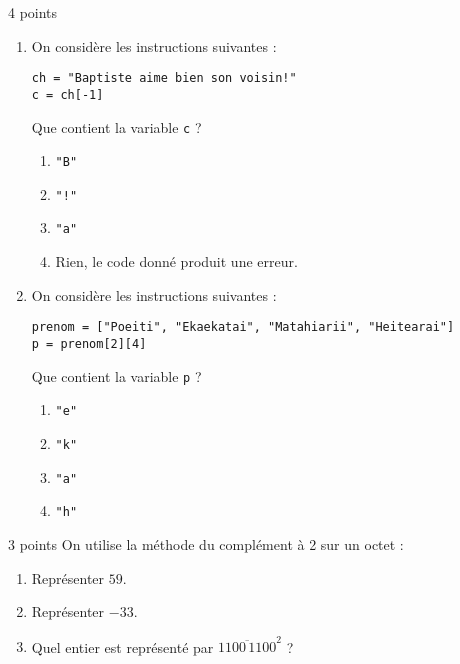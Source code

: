 \documentclass[a4paper,dvipsnames]{article}
\begin{document}
\begin{exercice}{4 points}{}
\begin{enumerate}
\begin{multicols}{2}
\begin{enumerate}
	  \item \texttt{[1, 4, 9, 16, 25]}
	  \item \texttt{[0, 1, 4, 9, 16]}
	  \item \texttt{[1, 4, 9, 16]}
        \end{enumerate}
      \end{multicols}
    \item On considère les instructions suivantes :
      \begin{verbatim}
ch = "Baptiste aime bien son voisin!"
c = ch[-1]
      \end{verbatim}
      Que contient la variable \texttt{c} ?
      \vspace*{-2mm}
      \begin{multicols}{2}
        \begin{enumerate}
	  \item \texttt{"B"}
	  \item \texttt{"!"}\columnbreak
	  \item \texttt{"a"}
	  \item Rien, le code donné produit une erreur.
        \end{enumerate}
      \end{multicols}
    \item On considère les instructions suivantes :
      \begin{verbatim}
prenom = ["Poeiti", "Ekaekatai", "Matahiarii", "Heitearai"]
p = prenom[2][4]
      \end{verbatim}
      Que contient la variable \texttt{p} ?
      \vspace*{-2mm}
      \begin{multicols}{4}
        \begin{enumerate}
	  \item \texttt{"e"}
	  \item \texttt{"k"}
	  \item \texttt{"a"}
	  \item \texttt{"h"}
        \end{enumerate}
      \end{multicols}
  \end{enumerate}
\end{exercice}

\medskip

\begin{exercice}{3 points}{}
 On utilise la méthode du complément à 2 sur un octet :
 \begin{enumerate}
   \item Représenter $59$.
   \item Représenter $-33$. 
   \item Quel entier est représenté par $\overline{1100\,1100}^2$ ?
 \end{enumerate}
\end{exercice}
\end{document}
